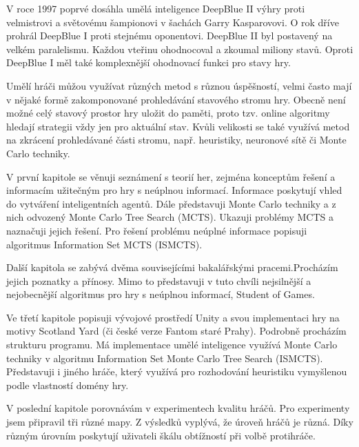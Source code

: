 

V roce 1997 poprvé dosáhla umělá inteligence DeepBlue II \cite{CAMPBELL200257} výhry proti velmistrovi a světovému šampionovi v šachách Garry Kasparovovi. O rok dříve prohrál DeepBlue I proti stejnému oponentovi. DeepBlue II byl postavený na velkém paralelismu. Každou vteřinu ohodnocoval a zkoumal miliony stavů. Oproti DeepBlue I měl také komplexnější ohodnovací funkci pro stavy hry.

Umělí hráči můžou využívat různých metod s různou úspěšností, velmi často mají v nějaké formě zakomponované prohledávání stavového stromu hry. Obecně není možné celý stavový prostor hry uložit do paměti, proto tzv. online algoritmy hledají strategii vždy jen pro aktuální stav. Kvůli velikosti se také využívá metod na zkrácení prohledávané části stromu, např. heuristiky, neuronové sítě či Monte Carlo techniky.

V první kapitole se věnuji seznámení s teorií her, zejména konceptům řešení a informacím užitečným pro hry s neúplnou informací. Informace poskytují vhled do vytváření inteligentních agentů. Dále představuji Monte Carlo techniky a z nich odvozený Monte Carlo Tree Search (MCTS). Ukazuji problémy MCTS a naznačuji jejich řešení. Pro řešení problému neúplné informace popisuji algoritmus Information Set MCTS (ISMCTS).

Další kapitola se zabývá dvěma souvisejícími bakalářskými pracemi.\hfill Procházím jejich poznatky a přínosy. Mimo to představuji v tuto chvíli nejsilnější a nejobecnější algoritmus pro hry s neúplnou informací, Student of Games. 

Ve třetí kapitole popisuji vývojové prostředí Unity a svou implementaci hry na motivy Scotland Yard (či české verze Fantom staré Prahy). Podrobně procházím strukturu programu. %
Má implementace umělé inteligence využívá Monte Carlo techniky v algoritmu Information Set Monte Carlo Tree Search (ISMCTS). Představuji i jiného hráče, který využívá pro rozhodování heuristiku vymyšlenou podle vlastností domény hry.

V poslední kapitole porovnávám v experimentech kvalitu hráčů. Pro experimenty jsem připravil tři různé mapy. Z výsledků vyplývá, že úroveň hráčů je různá. Díky různým úrovním poskytují uživateli škálu obtížností při volbě protihráče. 


